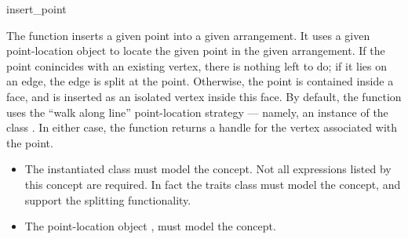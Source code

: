 \ccRefPageBegin

\begin{ccRefFunction}{insert_point}

\ccDefinition

The function \ccRefName{} inserts a given point into a given arrangement.
It uses a given point-location object to locate the given
point in the given arrangement. If the point conincides with an existing
vertex, there is nothing left to do; if it lies on an edge, the edge is
split at the point. Otherwise, the point is contained inside a face, and is
inserted as an isolated vertex inside this face.
By default, the function uses the ``walk along line'' point-location
strategy --- namely, an instance of the class
.
In either case, the function returns a handle for the vertex associated
with the point.



\ccRequirements
\begin{itemize}
\item The instantiated  class must model the
   concept. Not all expressions listed 
  by this concept are required. In fact the traits class must model the 
   concept, and support the splitting
  functionality.
\item The point-location object , must model the
   concept.
\end{itemize}

\end{ccRefFunction}

\ccRefPageEnd
